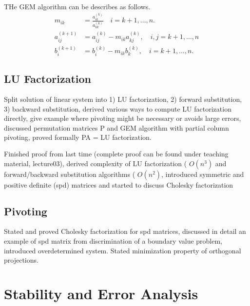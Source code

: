 \documentclass{article}
\theoremstyle{remark}
\begin{document}
 THe GEM algorithm can be describes as follows. 
 \begin{align}
   m_{ik} &= \frac{a_{ik}^{\left( k \right)}}{a_{kk}^{\left( k \right)}} \quad i = k+1 , \ldots, n. \\ 
   a_{ij}^{\left( k+1 \right)} &= a_{ij}^{\left( k \right)} - m_{ik} a _{kj}^{\left( k \right)}, \quad i,j = k+1, \ldots, n \\ 
   b_{i}^{\left( k+1 \right)} &= b_{i}^{\left( k \right)} - m_{ik}b_{k}^{\left( k \right)}, \quad i = k+1 , \ldots, n    
 .\end{align}

 

\subsection{LU Factorization}%
\label{sub:lu_factorization}
\begin{tcolorbox}
  Split solution of linear system into 1) LU factorization, 2) forward substitution, 3) backward substitution, derived various ways to compute LU factorization directly, give example where pivoting might be necessary or avoids large errors,  discussed permutation matrices P and GEM algorithm with partial column pivoting, proved formally PA = LU factorization. 
\end{tcolorbox}




\begin{tcolorbox}
  Finished proof from last time (complete proof can be found under teaching material, lecture03), derived complexity of LU factorization ( $O(n^3)$  and forward/backward substitution algorithms ( $O(n^2)$, introduced symmetric and positive definite (spd) matrices and started to discuss Cholesky factorization	
\end{tcolorbox}

\subsection{Pivoting}%
\label{sub:pivoting}
\begin{tcolorbox}
  Stated and proved Cholesky factorization for spd matrices, discussed in detail an example of spd matrix from discrimination of a boundary value problem, introduced overdetermined system. Stated minimization property of orthogonal projections.
\end{tcolorbox}

\newpage
\section{Stability and Error Analysis}%
\label{sec:stability_and_error_analysis}
\end{document}
